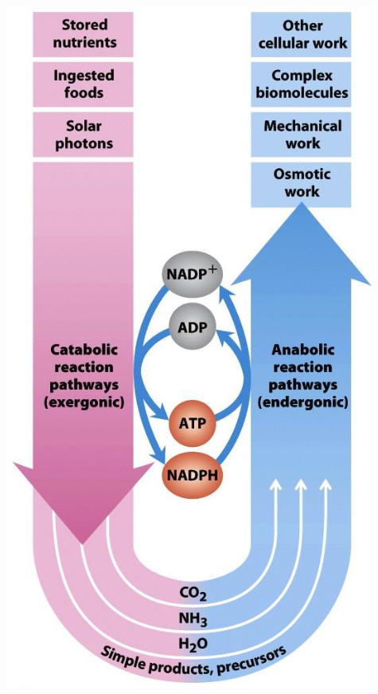 \documentclass[10pt]{article}
\begin{document}
\begin{center}
    \includegraphics[scale=0.6]{L4_2.png}
\end{center}
\end{document}
